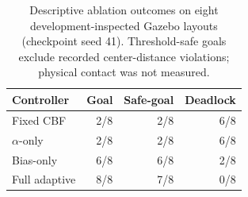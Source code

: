 \begin{table}[t]
\centering
\caption{Descriptive ablation outcomes on eight development-inspected Gazebo layouts (checkpoint seed 41). Threshold-safe goals exclude recorded center-distance violations; physical contact was not measured.}
\label{tab:v4_ablation_seed41}
\setlength{\tabcolsep}{3.5pt}
\begin{tabular}{lrrr}
\toprule
Controller & Goal & Safe-goal & Deadlock\\
\midrule
Fixed CBF & 2/8 & 2/8 & 6/8\\
$\alpha$-only & 2/8 & 2/8 & 6/8\\
Bias-only & 6/8 & 6/8 & 2/8\\
Full adaptive & 8/8 & 7/8 & 0/8\\
\bottomrule
\end{tabular}
\end{table}

